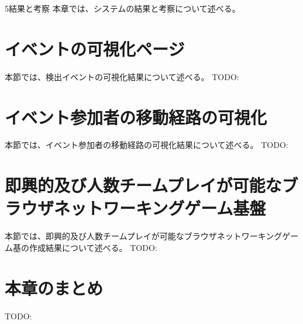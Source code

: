 \chapterhead
{5}{結果と考察}
{本章では、システムの結果と考察について述べる。}

\newpage
\section{イベントの可視化ページ}
本節では、検出イベントの可視化結果について述べる。
TODO:

\section{イベント参加者の移動経路の可視化}
本節では、イベント参加者の移動経路の可視化結果について述べる。
TODO:

\section{即興的及び人数チームプレイが可能なブラウザネットワーキングゲーム基盤}
本節では、即興的及び人数チームプレイが可能なブラウザネットワーキングゲーム基の作成結果について述べる。
TODO:

\newpage

\section{本章のまとめ}
TODO:

\newpage
